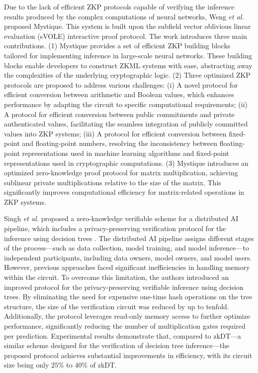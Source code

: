 \documentclass[journal]{IEEEtran}
\begin{document}
Due to the lack of efficient ZKP protocols capable of verifying the inference results produced by the complex computations of neural networks, Weng \emph{et al.} \cite{weng2021mystique} proposed Mystique. This system is built upon the subfield vector oblivious linear evaluation (sVOLE) \cite{yang2021quicksilver} interactive proof protocol. The work introduces three main contributions. (1) Mystique provides a set of efficient ZKP building blocks tailored for implementing inference in large-scale neural networks. These building blocks enable developers to construct ZKML systems with ease, abstracting away the complexities of the underlying cryptographic logic. (2) Three optimized ZKP protocols are proposed to address various challenges: (i) A novel protocol for efficient conversion between arithmetic and Boolean values, which enhances performance by adapting the circuit to specific computational requirements; (ii) A protocol for efficient conversion between public commitments and private authenticated values, facilitating the seamless integration of publicly committed values into ZKP systems; (iii) A protocol for efficient conversion between fixed-point and floating-point numbers, resolving the inconsistency between floating-point representations used in machine learning algorithms and fixed-point representations used in cryptographic computations. (3) Mystique introduces an optimized zero-knowledge proof protocol for matrix multiplication, achieving sublinear private multiplications relative to the size of the matrix. This significantly improves computational efficiency for matrix-related operations in ZKP systems.


Singh \emph{et al.} proposed a zero-knowledge verifiable scheme for a distributed AI pipeline, which includes a privacy-preserving verification protocol for the inference using decision trees \cite{singh2022zero}. The distributed AI pipeline assigns different stages of the process---such as data collection, model training, and model inference---to independent participants, including data owners, model owners, and model users. However, previous approaches faced significant inefficiencies in handling memory within the circuit. To overcome this limitation, the authors introduced an improved protocol for the privacy-preserving verifiable inference using decision trees. By eliminating the need for expensive one-time hash operations on the tree structure, the size of the verification circuit was reduced by up to tenfold. Additionally, the protocol leverages read-only memory access to further optimize performance, significantly reducing the number of multiplication gates required per prediction. Experimental results demonstrate that, compared to zkDT---a similar scheme designed for the verification of decision tree inference---the proposed protocol achieves substantial improvements in efficiency, with its circuit size being only $25\%$ to $40\%$ of zkDT.
\end{document}
